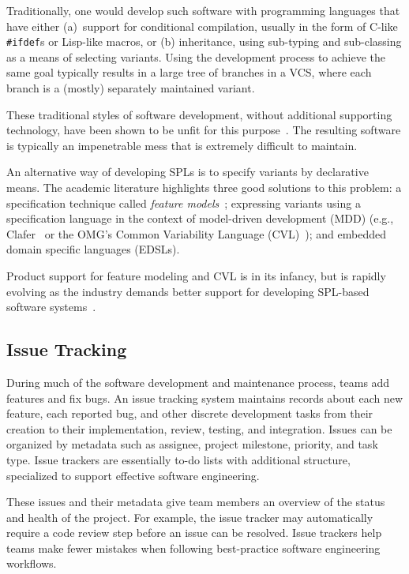 Traditionally, one would develop such software with programming
languages that have either (a)~support for conditional compilation,
usually in the form of C-like \texttt{\#ifdef}s or Lisp-like macros,
or (b) inheritance, using sub-typing and sub-classing as a means of
selecting variants. Using the development process to achieve the same
goal typically results in a large tree of branches in a VCS, where
each branch is a (mostly) separately maintained variant.

These traditional styles of software development, without additional
supporting technology, have been shown to be unfit for this
purpose~\cite{linden2007software,kastner2008granularity,chen2009variability}.
The resulting software is typically an impenetrable mess that is
extremely difficult to maintain.

An alternative way of developing SPLs is to specify variants by
declarative means.  The academic literature highlights three good
solutions to this problem: a specification technique called
\emph{feature models}~\cite{Kang90}; expressing variants using a
specification language in the context of model-driven development
(MDD) (e.g., Clafer~\cite{Clafer} or the OMG's Common Variability
Language (CVL)~\cite{haugen2012cvl}); and embedded domain specific
languages (EDSLs).

Product support for feature modeling and CVL is in its infancy, but is
rapidly evolving as the industry demands better support for developing
SPL-based software
systems~\cite{bosch2002maturity,bockle2004calculating}.

\subsection{Issue Tracking}

During much of the software development and maintenance process, teams
add features and fix bugs. An issue tracking system maintains records
about each new feature, each reported bug, and other discrete
development tasks from their creation to their implementation, review,
testing, and integration. Issues can be organized by metadata such as
assignee, project milestone, priority, and task type. Issue trackers
are essentially to-do lists with additional structure, specialized to
support effective software engineering.

These issues and their metadata give team members an overview of the
status and health of the project. For example, the issue tracker may
automatically require a code review step before an issue can be
resolved. Issue trackers help teams make fewer mistakes when following
best-practice software engineering workflows.


